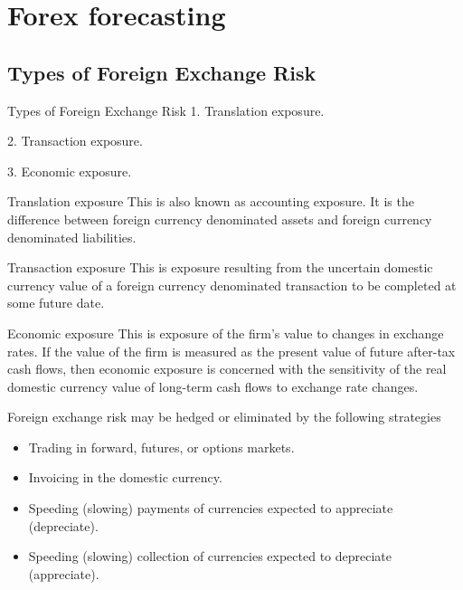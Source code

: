 \documentclass[international_finance_p2.tex]{subfiles}
\begin{document}
\section{Forex forecasting}

\subsection{Types of Foreign Exchange Risk}
\begin{frame}{Types of Foreign Exchange Risk}
1. Translation exposure. 

2. Transaction exposure. 

3. Economic exposure. 
\end{frame}

\begin{frame}
\begin{block}{Translation exposure}
This is also known as accounting exposure. It is the difference between foreign currency denominated assets and foreign currency denominated liabilities.
\end{block}
\end{frame}

\begin{frame}
\begin{block}{Transaction exposure}
This is exposure resulting from the uncertain domestic currency value of a foreign currency denominated transaction to be completed at some future date.
\end{block}
\end{frame}

\begin{frame}
\begin{block}{Economic exposure}
This is exposure of the firm’s value to changes in exchange rates. If the value of the firm is measured as the present value of future after-tax cash flows, then economic exposure is concerned with the sensitivity of the real domestic currency value of long-term cash flows to exchange rate changes.
\end{block}
\end{frame}
\begin{frame}{Foreign exchange risk may be hedged or eliminated by the following strategies}
\begin{itemize}[<+->]
\item
Trading in forward, futures, or options markets. 
\item
Invoicing in the domestic currency.
\item
Speeding (slowing) payments of currencies expected to appreciate (depreciate).
\item
Speeding (slowing) collection of currencies expected to depreciate (appreciate).
\end{itemize}
\end{frame}
\end{document}
